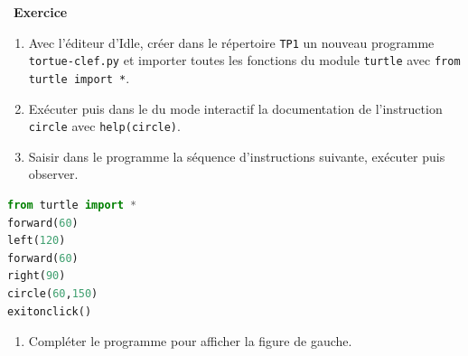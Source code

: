 \documentclass[
  11pt,
]{article}
\newcommand{\passthrough}[1]{#1}
\providecommand{\tightlist}{%
  \setlength{\itemsep}{0pt}\setlength{\parskip}{0pt}}
\newcounter{exo}
\newenvironment{exercice}[1]
{\par \medskip   \addtocounter{exo}{1} \noindent  
\begin{bclogo}[arrondi =0.1,   noborder = true, logo=\bccrayon, marge=4]{~\textbf{Exercice} \textbf{\theexo} {\itshape #1} }  \par}
{
\end{bclogo}
 \par \bigskip }
\newcounter{def}
\newcounter{prog}
\begin{document}
\begin{exercice}{}

\begin{enumerate}
\def\labelenumi{\arabic{enumi}.}
\tightlist
\item
  Avec l'éditeur d'Idle, créer dans le répertoire
  \passthrough{\lstinline!TP1!} un nouveau programme
  \passthrough{\lstinline!tortue-clef.py!} et importer toutes les
  fonctions du module \passthrough{\lstinline!turtle!} avec
  \passthrough{\lstinline!from turtle import *!}.
\item
  Exécuter puis dans le du mode interactif la documentation de
  l'instruction \passthrough{\lstinline!circle!} avec
  \passthrough{\lstinline!help(circle)!}.
\item
  Saisir dans le programme la séquence d'instructions suivante, exécuter
  puis observer.
\end{enumerate}

\begin{lstlisting}[language=Python]
from turtle import *
forward(60)
left(120)
forward(60)
right(90)
circle(60,150)
exitonclick() 
\end{lstlisting}

\begin{enumerate}
\def\labelenumi{\arabic{enumi}.}
\tightlist
\item
  Compléter le programme pour afficher la figure de gauche.
\end{enumerate}

\end{exercice}
\end{document}
